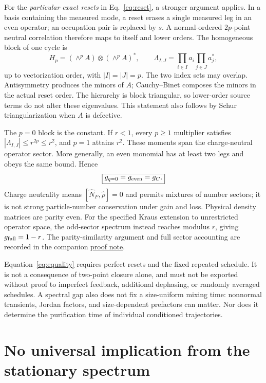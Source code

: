 \documentclass[aps,prb,twocolumn,nofootinbib,superscriptaddress]{revtex4-2}
\begin{document}
For the \emph{particular exact resets} in Eq.~\eqref{eq:reset}, a stronger
argument applies. In a basis containing the measured mode, a reset erases
a single measured leg in an even operator; an occupation pair is replaced
by $s$. A normal-ordered $2p$-point neutral correlation therefore maps to
itself and lower orders. The homogeneous block of one cycle is
\begin{equation}
 H_p=(\wedge^p A)\otimes(\wedge^p A)^*,
 \qquad
 \Lambda_{I,J}=\prod_{i\in I}a_i\prod_{j\in J}a_j^*,
 \label{eq:hierarchy}
\end{equation}
up to vectorization order, with $|I|=|J|=p$. The two index sets may
overlap. Antisymmetry produces the minors of $A$; Cauchy--Binet composes
the minors in the actual reset order. The hierarchy is block triangular,
so lower-order source terms do not alter these eigenvalues. This statement
also follows by Schur triangularization when $A$ is defective.

The $p=0$ block is the constant. If $r<1$, every $p\ge1$ multiplier
satisfies $|\Lambda_{I,J}|\le r^{2p}\le r^2$, and $p=1$ attains $r^2$.
These moments span the charge-neutral operator sector. More generally,
an even monomial has at least two legs and obeys the same bound. Hence
\begin{equation}
 \boxed{g_{q=0}=g_{\rm even}=g_C.}\label{eq:equality}
\end{equation}
Charge neutrality means $[\hat N_F,\hat\rho]=0$ and permits mixtures
of number sectors; it is not strong particle-number conservation under
gain and loss. Physical density matrices are parity even. For the
specified Kraus extension to unrestricted operator space, the odd-sector
spectrum instead reaches modulus $r$, giving $g_{\rm full}=1-r$.
The parity-similarity argument and full sector accounting are recorded
in the companion \href{../channel_gap_proof/channel_gap_proof.pdf}{proof note}.

Equation~\eqref{eq:equality} requires perfect resets and the fixed repeated
schedule. It is not a consequence of two-point closure alone, and must not
be exported without proof to imperfect feedback, additional dephasing, or
randomly averaged schedules. A spectral gap also does not fix a
size-uniform mixing time: nonnormal transients, Jordan factors, and
size-dependent prefactors can matter. Nor does it determine the
purification time of individual conditioned trajectories.

\section{No universal implication from the stationary spectrum}
\end{document}
